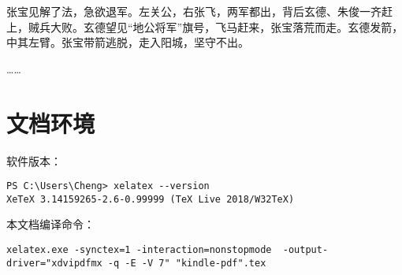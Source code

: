 \documentclass{ctexbook}
\begin{document}
张宝见解了法，急欲退军。左关公，右张飞，两军都出，背后玄德、朱俊一齐赶上，贼兵大败。玄德望见“地公将军”旗号，飞马赶来，张宝落荒而走。玄德发箭，中其左臂。张宝带箭逃脱，走入阳城，坚守不出。

……

\chapter{文档环境}

软件版本：

\begin{lstlisting}
PS C:\Users\Cheng> xelatex --version
XeTeX 3.14159265-2.6-0.99999 (TeX Live 2018/W32TeX)
\end{lstlisting}

本文档编译命令：

\begin{lstlisting}
xelatex.exe -synctex=1 -interaction=nonstopmode  -output-driver="xdvipdfmx -q -E -V 7" "kindle-pdf".tex
\end{lstlisting}
\end{document}
